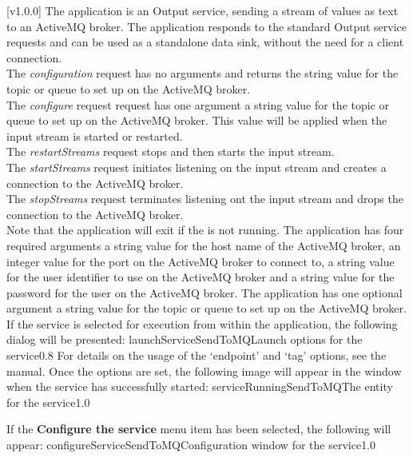 [v1.0.0]
The  application is an Output service, sending a stream
of \yarp{} values as \json{} text to an ActiveMQ broker.
The application responds to the standard Output service requests and can be used as a
standalone data sink, without the need for a client connection.\\

The \emph{configuration} request has no arguments and returns the string value for the
topic or queue to set up on the ActiveMQ broker.\\

The \emph{configure} request request has one argument \longDash{} a string value for the
topic or queue to set up on the ActiveMQ broker.
This value will be applied when the input stream is started or restarted.\\

The \emph{restartStreams} request stops and then starts the input stream.\\

The \emph{startStreams} request initiates listening on the input stream and creates a
connection to the ActiveMQ broker.\\

The \emph{stopStreams} request terminates listening ont the input stream and drops the
connection to the ActiveMQ broker.\\ 

Note that the application will exit if the \emph{\RS} is not running.
The application has four required arguments \longDash{} a string value for the host name
of the ActiveMQ broker, an integer value for the port on the ActiveMQ broker to
connect to, a string value for the user identifier to use on the ActiveMQ broker and a
string value for the password for the user on the ActiveMQ broker.
The application has one optional argument \longDash{} a string value for the
topic or queue to set up on the ActiveMQ broker.
\insertAppParameters
\insertTagDescription{\SMO}
\insertInputServiceComment
\condPage
\insertStandardServiceCommands
\secondaryEnd
{}
If the service is selected for execution from within the \emph{\MMMU} application, the
following dialog will be presented:
%
{launchServiceSendToMQ}{Launch options for the \emph{\SMO} service}{0.8}
\condPage{}
For details on the usage of the `endpoint' and `tag' options, see the \emph{\MMMU} manual.
Once the options are set, the following image will appear in the \emph{\MMMU} window when
the service has successfully started:
%
{serviceRunningSendToMQ}{The \emph{\MMMU} entity for the \emph{\SMO} service}{1.0}

If the \textbf{Configure the service} menu item has been selected, the following will
appear:
%
{configureServiceSendToMQ}{Configuration window for the \emph{\SMO} service}{1.0}
\secondaryEnd
\primaryEnd{}
